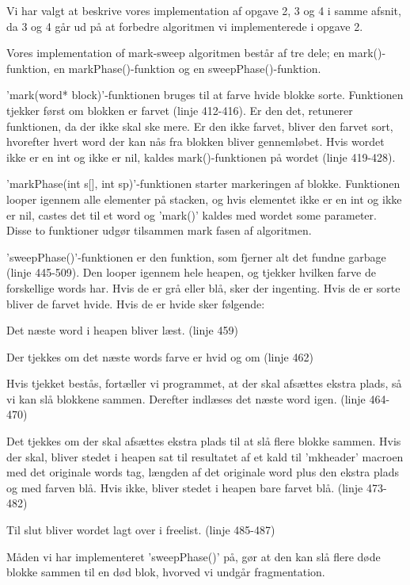 Vi har valgt at beskrive vores implementation af opgave 2, 3 og 4 i samme afsnit, da 3 og 4 går ud på at forbedre algoritmen vi implementerede i opgave 2.

Vores implementation of mark-sweep algoritmen består af tre dele; en mark()-funktion, en markPhase()-funktion og en sweepPhase()-funktion. 

'mark(word* block)'-funktionen bruges til at farve hvide blokke sorte. Funktionen tjekker først om blokken er farvet (linje 412-416). Er den det, retunerer funktionen, da der ikke skal ske mere. Er den ikke farvet, bliver den farvet sort, hvorefter hvert word der kan nås fra blokken bliver gennemløbet. Hvis wordet ikke er en int og ikke er nil, kaldes mark()-funktionen på wordet (linje 419-428).

'markPhase(int s[], int sp)'-funktionen starter markeringen af blokke. Funktionen looper igennem alle elementer på stacken, og hvis elementet ikke er en int og ikke er nil, castes det til et word og 'mark()' kaldes med wordet some parameter. Disse to funktioner udgør tilsammen mark fasen af algoritmen.

'sweepPhase()'-funktionen er den funktion, som fjerner alt det fundne garbage (linje 445-509). Den looper igennem hele heapen, og tjekker hvilken farve de forskellige words har. Hvis de er grå eller blå, sker der ingenting. Hvis de er sorte bliver de farvet hvide. Hvis de er hvide sker følgende:
\begin{my_enumerate}
	\item Det næste word i heapen bliver læst. (linje 459)
	\item Der tjekkes om det næste words farve er hvid og om (linje 462) %
	\item Hvis tjekket bestås, fortæller vi programmet, at der skal afsættes ekstra plads, så vi kan slå blokkene sammen. Derefter indlæses det næste word igen. (linje 464-470)
	\item Det tjekkes om der skal afsættes ekstra plads til at slå flere blokke sammen. Hvis der skal, bliver stedet i heapen sat til resultatet af et kald til 'mkheader' macroen med det originale words tag, længden af det originale word plus den ekstra plads og med farven blå. Hvis ikke, bliver stedet i heapen bare farvet blå. (linje 473-482)
	\item Til slut bliver wordet lagt over i freelist. (linje 485-487)
\end{my_enumerate}

Måden vi har implementeret 'sweepPhase()' på, gør at den kan slå flere døde blokke sammen til en død blok, hvorved vi undgår fragmentation.

